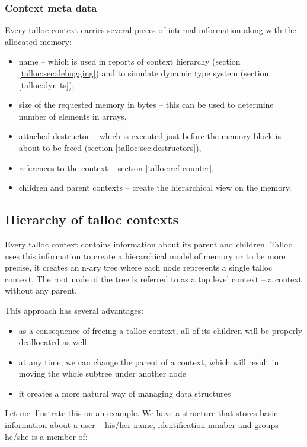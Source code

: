 \subsubsection{Context meta data}
Every talloc context carries several pieces of internal information along with
the allocated memory:

\begin{itemize}
  \item name -- which is used in reports of context hierarchy (section
  \ref{talloc:sec:debugging}) and to simulate dynamic type system (section
  \ref{talloc:dyn-ts}),
  \item size of the requested memory in bytes -- this can be used to determine
  number of elements in arrays,
  \item attached destructor -- which is executed just before the memory block is
  about to be freed (section \ref{talloc:sec:destructors}),
  \item references to the context -- section \ref{talloc:ref-counter},
  \item children and parent contexts -- create the hierarchical view on the
  memory.
\end{itemize}

\subsection{Hierarchy of talloc contexts}

Every talloc context contains information about its parent and children. Talloc
uses this information to create a hierarchical model of memory or to be more
precise, it creates an n-ary tree where each node represents a single talloc
context. The root node of the tree is referred to as a top level context -- a
context without any parent.

This approach has several advantages:

\begin{itemize}
  \item as a consequence of freeing a talloc context, all of its children
  will be properly deallocated as well
  \item at any time, we can change the parent of a context, which
  will result in moving the whole subtree under another node
  \item it creates a more natural way of managing data structures
\end{itemize}

Let me illustrate this on an example. We have a structure that stores basic
information about a user -- his/her name, identification number and groups
he/she is a member of:

